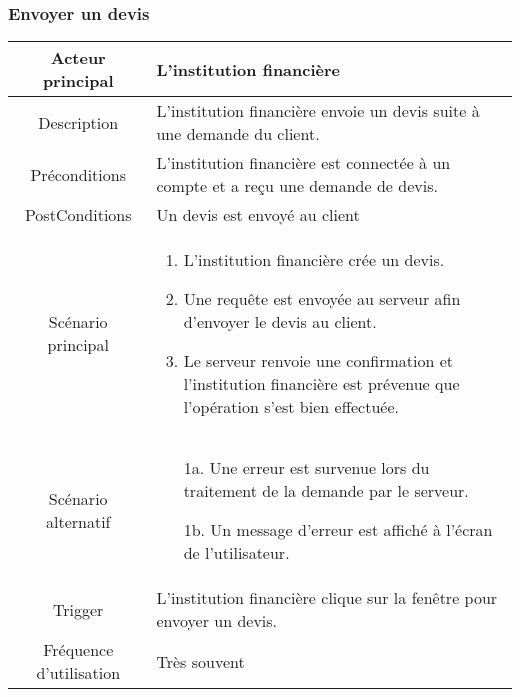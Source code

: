 \documentclass{article}
\begin{document}
\subsubsection{Envoyer un devis}
\begin{table}[h]
    \begin{tabular}{|c|p{10cm}|}
       \hline
       Acteur principal&L'institution financière\\
       \hline
       Description&L'institution financière envoie un devis suite à une demande du client.\\
       \hline
       Préconditions&L'institution financière est connectée à un compte et a reçu une demande de devis.\\
       \hline
       PostConditions&Un devis est envoyé au client\\
       \hline
       Scénario principal& 
             \begin{enumerate}
                \item L'institution financière crée un devis.
                \item Une requête est envoyée au serveur afin d'envoyer le devis au client.
                \item Le serveur renvoie une confirmation et l'institution financière est prévenue que l'opération s'est bien effectuée.
             \end{enumerate}     \\
       \hline
       Scénario alternatif&    
       \begin{itemize}
        \item[1a.] Une erreur est survenue lors du traitement de la demande par le serveur.
        \item[1b.] Un message d'erreur est affiché à l'écran de l'utilisateur. 
        \end{itemize}
       \\
       \hline
       Trigger&L'institution financière clique sur la fenêtre pour envoyer un devis.\\
       \hline
       Fréquence d'utilisation&Très souvent\\
       \hline
    \end{tabular}
 \end{table}
\end{document}
